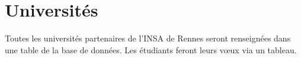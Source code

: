\chapter{Universités}
Toutes les universités partenaires de l'INSA de Rennes seront renseignées dans une table de la base de données. Les étudiants feront leurs vœux via un tableau.
